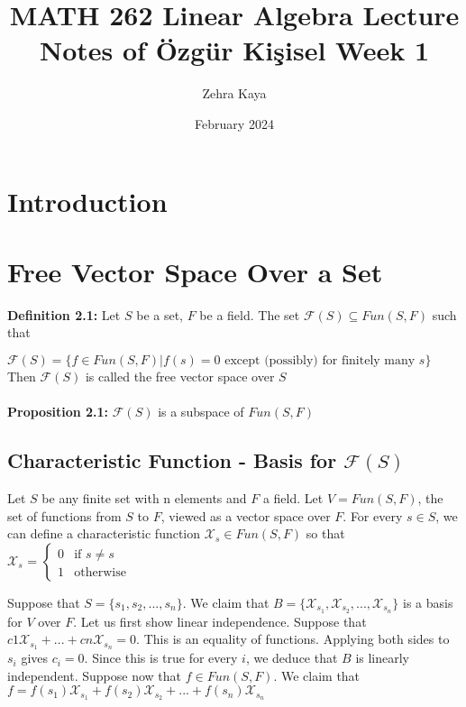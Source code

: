 \documentclass{article}
\title{MATH 262 Linear Algebra
Lecture Notes of Özgür Kişisel Week 1 }
\author{Zehra Kaya}
\date{February 2024}
\begin{document}
\maketitle
\tableofcontents


\section{Introduction}
\section{Free Vector Space Over a Set}

\textbf{Definition 2.1: } Let $S$ be a set, $F$ be a field. The set $ \mathcal{F}(S)\subseteq Fun(S,F) $ such that 

$\mathcal{F}(S) = \{f\in Fun(S,F) | f(s) = 0 \text{ except (possibly) for finitely many } s\}$\\

Then $\mathcal{F}(S)$ is called the free vector space over $S$\\ \\
\textbf{Proposition 2.1:} $ \mathcal{F}(S)$ is a subspace of $ Fun( S,F) $
\subsection{Characteristic Function - Basis for $\mathcal{F}(S)$ }

Let $S$ be any finite set with n elements and $F$ a field. Let $V = F un(S, F )$, the set of functions from $S$ to $F$, viewed as a vector space over $F$. For every $s \in S$, we can define a characteristic function $\mathcal{X}_s \in Fun(S, F )$ so that \\
 $\mathcal{X}_s$ = 
 $\begin{cases} 
        0 & \text{if $s\neq s$} \\ 
        1 & \text{otherwise} 
    \end{cases}$

Suppose that $S = \{s_1,s_2,...,s_n\}$. We claim that $B = \{\mathcal{X}_{s_1},\mathcal{X}_{s_2},...,\mathcal{X}_{s_n}\}$ is a basis for $V$ over $F$.
Let us first show linear independence. Suppose that $c1\mathcal{X}_{s_1} +...+cn\mathcal{X}_{s_n} =0.$ This is an equality of functions. Applying both sides to $s_i$ gives $c_i = 0$.
Since this is true for every $i$, we deduce that $B$ is linearly independent. Suppose now that $f \in Fun(S, F )$.
We claim that $f =f(s_1)\mathcal{X}_{s_1} +f(s_2)\mathcal{X}_{s_2} +...+f(s_n)\mathcal{X}_{s_n}$
\end{document}
